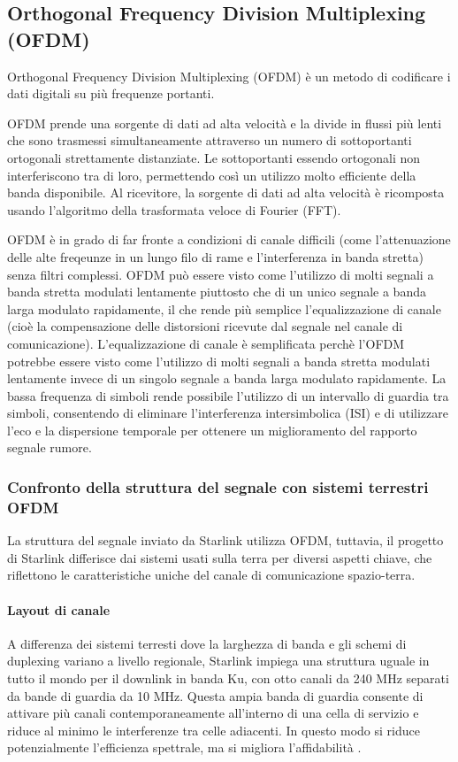 \subsection{Orthogonal Frequency Division Multiplexing (OFDM)}
Orthogonal Frequency Division Multiplexing (\acs{OFDM}) è un metodo di codificare i dati digitali su più frequenze portanti.

\ac{OFDM} prende una sorgente di dati ad alta velocità e la divide in flussi più lenti che sono trasmessi simultaneamente attraverso un numero di sottoportanti ortogonali strettamente distanziate.
Le sottoportanti essendo ortogonali non interferiscono tra di loro, permettendo così un utilizzo molto efficiente della banda disponibile.
Al ricevitore, la sorgente di dati ad alta velocità è ricomposta usando l'algoritmo della trasformata veloce di Fourier (FFT).

\ac{OFDM} è in grado di far fronte a condizioni di canale difficili (come l'attenuazione delle alte freqeunze in un lungo filo di rame e l'interferenza in banda stretta) senza filtri complessi.
\ac{OFDM} può essere visto come l'utilizzo di molti segnali a banda stretta modulati lentamente piuttosto che di un unico segnale a banda larga modulato rapidamente, il che rende più semplice l'equalizzazione di canale (cioè la compensazione delle distorsioni ricevute dal segnale nel canale di comunicazione).
L'equalizzazione di canale è semplificata perchè l'\ac{OFDM} potrebbe essere visto come l'utilizzo di molti segnali a banda stretta modulati lentamente invece di un singolo segnale a banda larga modulato rapidamente.
La bassa frequenza di simboli rende possibile l'utilizzo di un intervallo di guardia tra simboli, consentendo di eliminare l'interferenza intersimbolica (ISI) e di utilizzare l'eco e la dispersione temporale per ottenere un miglioramento del rapporto segnale rumore.

\subsubsection{Confronto della struttura del segnale con sistemi terrestri OFDM}
La struttura del segnale inviato da Starlink utilizza \ac{OFDM}, tuttavia, il progetto di Starlink differisce dai sistemi usati sulla terra per diversi aspetti chiave, che riflettono le caratteristiche uniche del canale di comunicazione spazio-terra.

\paragraph{Layout di canale} A differenza dei sistemi terresti dove la larghezza di banda e gli schemi di duplexing variano a livello regionale, Starlink impiega una struttura uguale in tutto il mondo per il downlink in banda Ku, con otto canali da 240 MHz separati da bande di guardia da 10 MHz.
Questa ampia banda di guardia consente di attivare più canali contemporaneamente all'interno di una cella di servizio e riduce al minimo le interferenze tra celle adiacenti.
In questo modo si riduce potenzialmente l'efficienza spettrale, ma si migliora l'affidabilità \cite{humphreys_signal_2023}.

